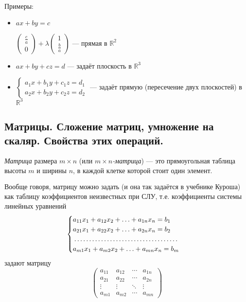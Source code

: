 \documentclass[a4paper, 12pt]{article}
\begin{document}
Примеры:
\begin{itemize}
    \item $ax+by=c$ 
    
    $\begin{pmatrix}
    \frac c a \\ 0
    \end{pmatrix} + \lambda
    \begin{pmatrix}
    1 \\ \frac b a
    \end{pmatrix}$ --- прямая в $\mathbb{R}^2$
    \item $ax+by+cz=d$ 
    --- задаёт плоскость в $\mathbb{R}^3$
    \item $ 
        \begin{cases}
            a_1x+b_1y+c_1z=d_1\\
            a_2x+b_2y+c_2z=d_2
        \end{cases}$  --- задаёт прямую (пересечение двух плоскостей) в $\mathbb{R}^3$
\end{itemize}

\subsection{Матрицы. Сложение матриц, умножение на скаляр. Свойства этих операций.}
\textit{Матрица} размера $m \times n$ (или \textit{$m \times n$-матрица}) --- это прямоугольная таблица высоты $m$ и ширины $n$, в каждой клетке которой стоит один элемент.

Вообще говоря, матрицу можно задать (и она так задаётся в учебнике Куроша) как таблицу коэффициентов неизвестных при СЛУ, т.е. коэффициенты системы линейных уравнений
\[\begin{cases}
a_{11}x_1 + a_{12}x_2 + \ldots + a_{1n}x_n = b_1 \\
a_{21}x_1 + a_{22}x_2 + \ldots + a_{2n}x_n = b_2 \\
\dotfill \\
a_{m1}x_1 + a_{m2}x_2 + \ldots + a_{mn}x_n = b_m 
\end{cases}\]
задают матрицу
\[\begin{pmatrix}
a_{11} & a_{12} & \cdots & a_{1n} \\
a_{21} & a_{22} & \cdots & a_{2n} \\
\vdots & \vdots & \ddots & \vdots \\
a_{m1} & a_{m2} & \cdots & a_{mn}
\end{pmatrix}\]
\end{document}
